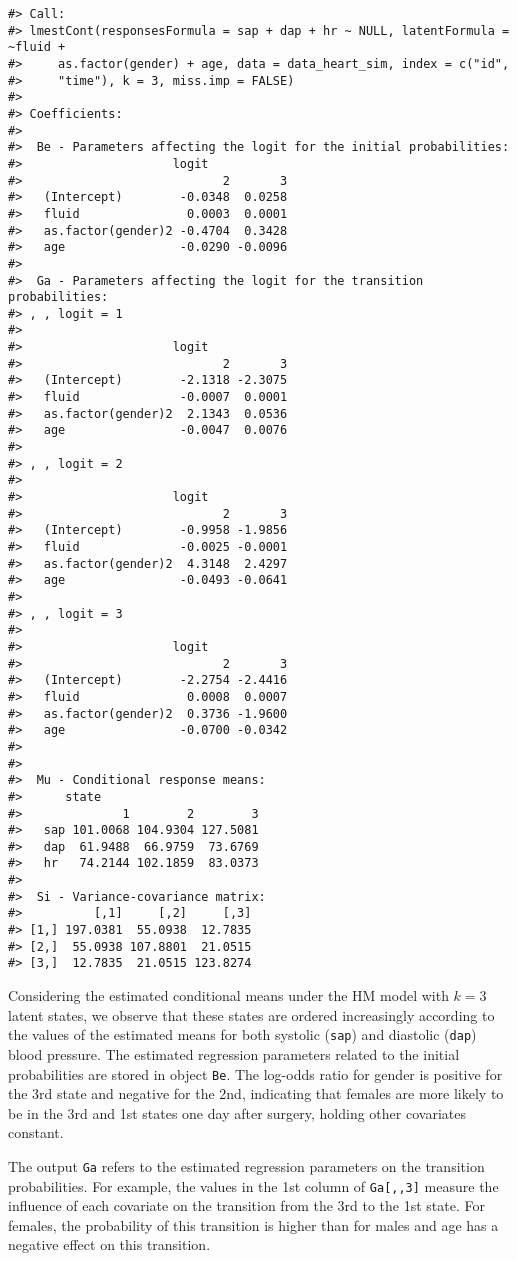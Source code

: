 \begin{verbatim}
#> Call:
#> lmestCont(responsesFormula = sap + dap + hr ~ NULL, latentFormula = ~fluid + 
#>     as.factor(gender) + age, data = data_heart_sim, index = c("id", 
#>     "time"), k = 3, miss.imp = FALSE)
#> 
#> Coefficients:
#> 
#>  Be - Parameters affecting the logit for the initial probabilities:
#>                     logit
#>                            2       3
#>   (Intercept)        -0.0348  0.0258
#>   fluid               0.0003  0.0001
#>   as.factor(gender)2 -0.4704  0.3428
#>   age                -0.0290 -0.0096
#> 
#>  Ga - Parameters affecting the logit for the transition probabilities:
#> , , logit = 1
#> 
#>                     logit
#>                            2       3
#>   (Intercept)        -2.1318 -2.3075
#>   fluid              -0.0007  0.0001
#>   as.factor(gender)2  2.1343  0.0536
#>   age                -0.0047  0.0076
#> 
#> , , logit = 2
#> 
#>                     logit
#>                            2       3
#>   (Intercept)        -0.9958 -1.9856
#>   fluid              -0.0025 -0.0001
#>   as.factor(gender)2  4.3148  2.4297
#>   age                -0.0493 -0.0641
#> 
#> , , logit = 3
#> 
#>                     logit
#>                            2       3
#>   (Intercept)        -2.2754 -2.4416
#>   fluid               0.0008  0.0007
#>   as.factor(gender)2  0.3736 -1.9600
#>   age                -0.0700 -0.0342
#> 
#> 
#>  Mu - Conditional response means:
#>      state
#>              1        2        3
#>   sap 101.0068 104.9304 127.5081
#>   dap  61.9488  66.9759  73.6769
#>   hr   74.2144 102.1859  83.0373
#> 
#>  Si - Variance-covariance matrix:
#>          [,1]     [,2]     [,3]
#> [1,] 197.0381  55.0938  12.7835
#> [2,]  55.0938 107.8801  21.0515
#> [3,]  12.7835  21.0515 123.8274
\end{verbatim}

Considering the estimated conditional means under the HM model with
\(k = 3\) latent states, we observe that these states are ordered
increasingly according to the values of the estimated means for both
systolic (\texttt{sap}) and diastolic (\texttt{dap}) blood pressure. The estimated
regression parameters related to the initial probabilities are stored in
object \texttt{Be}. The log-odds ratio for gender is positive for the 3rd state
and negative for the 2nd, indicating that females are more likely to be
in the 3rd and 1st states one day after surgery, holding other covariates constant.

The output \texttt{Ga} refers to the estimated regression parameters on the
transition probabilities. For example, the values in the 1st column of
\texttt{Ga{[},,3{]}} measure the influence of each covariate on the transition
from the 3rd to the 1st state. For females, the probability of this
transition is higher than for males and age has a negative effect on this transition.

